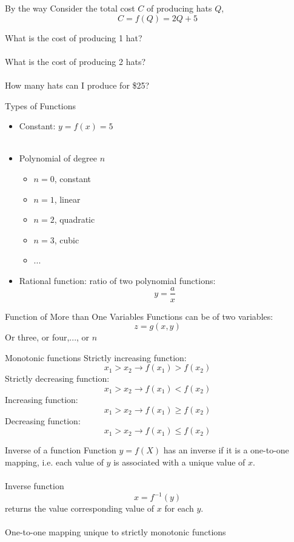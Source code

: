 \documentclass{./../../Latex/teaching_slides}
\begin{document}
\begin{frame}{By the way}
Consider the total cost $C$ of producing hats $Q$,
$$ C = f(Q) = 2Q + 5 $$
\vspace{0.3em}

What is the cost of producing 1 hat? \\~\\
What is the cost of producing 2 hats? \\~\\
How many hats can I produce for \$25?
\end{frame}

\begin{frame}{Types of Functions}

\begin{itemize}
\item Constant: $y = f(x) = 5$ \\~\\
\item Polynomial of degree $n$ 
\begin{itemize}
\item[] $n=0$, constant
\item[] $n=1$, linear
\item[] $n=2$, quadratic
\item[] $n=3$, cubic
\item[] ...
\end{itemize}
\item Rational function: ratio of two polynomial functions:
$$ y = \frac{a}{x} $$
\end{itemize}
\end{frame}

\begin{frame}{Function of More than One Variables}
Functions can be of two variables:
$$ z=g(x,y) $$
Or three, or four,..., or $n$
\end{frame}


\begin{frame}{Monotonic functions}
	Strictly increasing function:
$$ x_{1}>x_{2} \rightarrow f\left(x_{1}\right)>f\left(x_{2}\right) $$
Strictly decreasing function:
$$ x_{1}>x_{2} \rightarrow f\left(x_{1}\right)<f\left(x_{2}\right) $$
Increasing function:
$$ x_{1}>x_{2} \rightarrow f\left(x_{1}\right)\geq f\left(x_{2}\right) $$
Decreasing function:
$$ x_{1}>x_{2} \rightarrow f\left(x_{1}\right)\leq f\left(x_{2}\right) $$
\end{frame}

\begin{frame}{Inverse of a function}
Function $y=f(X)$ has an inverse if it is a one-to-one mapping, i.e. each value of $y$ is associated with a unique value of $x$. \\~\\
Inverse function $$x=f^{-1}(y)$$ returns the value corresponding value of $x$ for each $y$. \\~\\
One-to-one mapping unique to strictly monotonic functions
\end{frame}
\end{document}
